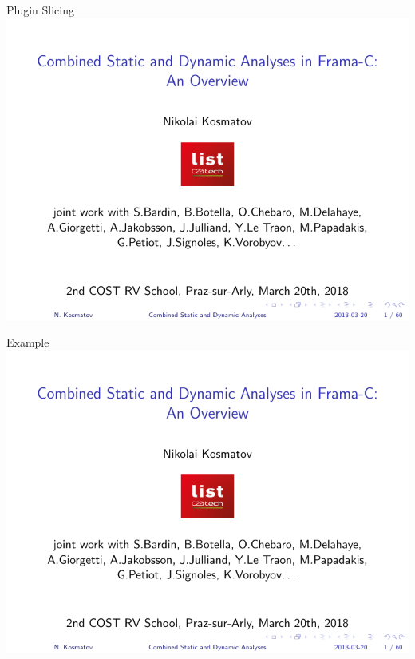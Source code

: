 
\begin{frame}{Plugin Slicing}
  \includegraphics[page=48,width=\textwidth,trim={0cm 1cm 0 2cm},clip]{tutorial_2018_03_20_costrv2018.pdf}
\end{frame}


\begin{frame}{Example}
  \includegraphics[page=49,width=\textwidth,trim={0cm 1cm 0 2cm},clip]{tutorial_2018_03_20_costrv2018.pdf}
\end{frame}


